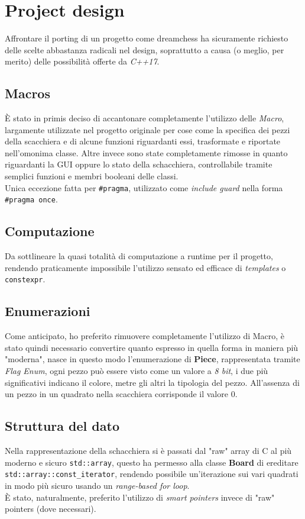 \documentclass{article}
\begin{document}
    \section{Project design}\label{sec:design}
        Affrontare il porting di un progetto come dreamchess ha sicuramente richiesto delle scelte abbastanza radicali nel design, soprattutto a causa (o meglio, per merito) delle possibilità offerte da \textit{C++17}.
        \subsection{Macros}\label{subsec:macros}
            È stato in primis deciso di accantonare completamente l'utilizzo delle \textit{Macro}, largamente utilizzate nel progetto originale per cose come la specifica dei pezzi della scacchiera e di alcune funzioni riguardanti essi, trasformate e riportate nell'omonima classe.
            Altre invece sono state completamente rimosse in quanto riguardanti la GUI oppure lo stato della schacchiera, controllabile tramite semplici funzioni e membri booleani delle classi.\\
            Unica eccezione fatta per \texttt{\#pragma}, utilizzato come \textit{include guard} nella forma \texttt{\#pragma once}.
        \subsection{Computazione}\label{subsec:computation}
            Da sottlineare la quasi totalità di computazione a runtime per il progetto, rendendo praticamente impossibile l'utilizzo sensato ed efficace di \textit{templates} o \texttt{constexpr}.
        \subsection{Enumerazioni}\label{subsec:enum}
            Come anticipato, ho preferito rimuovere completamente l'utilizzo di Macro, è stato quindi necessario convertire quanto espresso in quella forma in maniera più "moderna", nasce in questo modo l'enumerazione di \textbf{Piece}, rappresentata tramite \textit{Flag Enum}, ogni pezzo può essere visto come un valore a \textit{8 bit}, i due più significativi indicano il colore, metre gli altri la tipologia del pezzo.
            All'assenza di un pezzo in un quadrato nella scacchiera corrisponde il valore 0.
        \subsection{Struttura del dato}\label{subsec:datastruct}
            Nella rappresentazione della schacchiera si è passati dal "raw" array di C al più moderno e sicuro \texttt{std::array}, questo ha permesso alla classe \textbf{Board} di ereditare \texttt{std::array::const\_iterator}, rendendo possibile un'iterazione sui vari quadrati in modo più sicuro usando un \textit{range-based for loop}.\\
            È stato, naturalmente, preferito l'utilizzo di \textit{smart pointers} invece di "raw" pointers (dove necessari).
    \newpage
\end{document}
